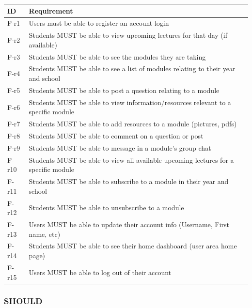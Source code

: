 \begin{tabular}{|p{1cm}|p{13cm}|}
    \hline
        \textbf{ID} & \textbf{Requirement} \\
    \hline
    F-r1 &
    Users must be able to register an account login \\
    \hline
    F-r2 & 
    Students MUST be able to view upcoming lectures for that day (if available) \\
    \hline
    F-r3 &
    Students MUST be able to see the modules they are taking \\
    \hline
    F-r4 &
    Students MUST be able to see a list of modules relating to their year and school \\
    \hline
    F-r5 &
    Students MUST be able to post a question relating to a module \\
    \hline
    F-r6 &
    Students MUST be able to view information/resources relevant to a specific module \\
    \hline
    F-r7 &
    Students MUST be able to add resources to a module (pictures, pdfs) \\
    \hline
    F-r8 &
    Students MUST be able to comment on a question or post \\
    \hline
    F-r9 &
    Students MUST be able to message in a module’s group chat \\
    \hline
    F-r10 &
    Students MUST be able to view all available upcoming lectures for a specific module \\
    \hline
    F-r11 &
    Students MUST be able to subscribe to a module in their year and school \\
    \hline
    F-r12 &
    Students MUST be able to unsubscribe to a module \\
    \hline
    F-r13 &
    Users MUST be able to update their account info (Username, First name, etc) \\
    \hline
    F-r14 &
    Students MUST be able to see their home dashboard (user area home page) \\
    \hline
    F-r15 &
    Users MUST be able to log out of their account \\
    \hline
\end{tabular}

\subsubsection{SHOULD}

